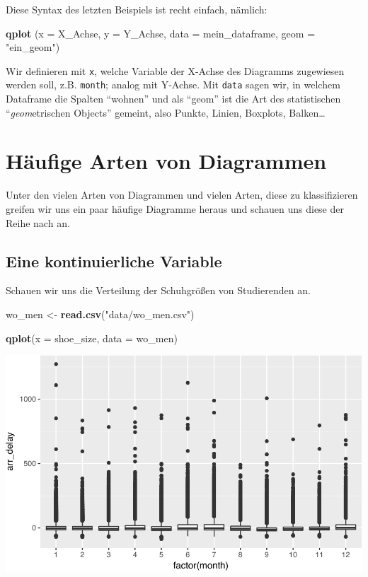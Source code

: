 \documentclass[12pt,ngerman,]{book}
\newenvironment{Shaded}{\begin{snugshade}}{\end{snugshade}}
\newcommand{\KeywordTok}[1]{\textcolor[rgb]{0.13,0.29,0.53}{\textbf{{#1}}}}
\newcommand{\DataTypeTok}[1]{\textcolor[rgb]{0.13,0.29,0.53}{{#1}}}
\newcommand{\StringTok}[1]{\textcolor[rgb]{0.31,0.60,0.02}{{#1}}}
\newcommand{\NormalTok}[1]{{#1}}
\renewenvironment{Shaded}{\begin{kframe}}{\end{kframe}}
\begin{document}
Diese Syntax des letzten Beispiels ist recht einfach, nämlich:

\begin{Shaded}
\begin{Highlighting}[]
\KeywordTok{qplot} \NormalTok{(}\DataTypeTok{x =} \NormalTok{X_Achse, }\DataTypeTok{y =} \NormalTok{Y_Achse, }\DataTypeTok{data =} \NormalTok{mein_dataframe, }\DataTypeTok{geom =} \StringTok{"ein_geom"}\NormalTok{)}
\end{Highlighting}
\end{Shaded}

Wir definieren mit \texttt{x}, welche Variable der X-Achse des Diagramms
zugewiesen werden soll, z.B. \texttt{month}; analog mit Y-Achse. Mit
\texttt{data} sagen wir, in welchem Dataframe die Spalten ``wohnen'' und
als ``geom'' ist die Art des statistischen ``\emph{geom}etrischen
Objects'' gemeint, also Punkte, Linien, Boxplots, Balken\ldots{}

\section{Häufige Arten von
Diagrammen}\label{haufige-arten-von-diagrammen}

Unter den vielen Arten von Diagrammen und vielen Arten, diese zu
klassifizieren greifen wir uns ein paar häufige Diagramme heraus und
schauen uns diese der Reihe nach an.

\subsection{Eine kontinuierliche
Variable}\label{eine-kontinuierliche-variable}

Schauen wir uns die Verteilung der Schuhgrößen von Studierenden an.

\begin{Shaded}
\begin{Highlighting}[]
\NormalTok{wo_men <-}\StringTok{ }\KeywordTok{read.csv}\NormalTok{(}\StringTok{"data/wo_men.csv"}\NormalTok{)}

\KeywordTok{qplot}\NormalTok{(}\DataTypeTok{x =} \NormalTok{shoe_size, }\DataTypeTok{data =} \NormalTok{wo_men)}
\end{Highlighting}
\end{Shaded}

\begin{center}\includegraphics[width=0.7\linewidth]{050_Daten_visualisieren_files/figure-latex/unnamed-chunk-6-1} \end{center}
\end{document}
